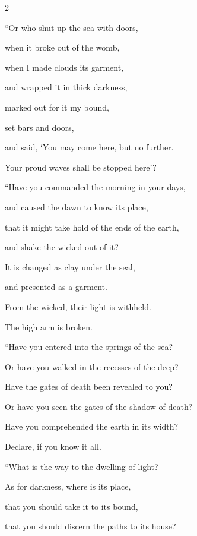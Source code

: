\begin{multicols}{2}
	\vspace{\baselineskip}
	
	\myverse{}“Or who shut up the sea with doors,
	
	when it broke out of the womb,
	
	\myverse{}when I made clouds its garment,
	
	and wrapped it in thick darkness,
	
	\myverse{}marked out for it my bound,
	
	set bars and doors,
	
	\myverse{}and said, ‘You may come here, but no further.
	
	Your proud waves shall be stopped here’?
	
	\vspace{\baselineskip}
	
	
	\myverse{}“Have you commanded the morning in your days,
	
	and caused the dawn to know its place,
	
	\myverse{}that it might take hold of the ends of the earth,
	
	and shake the wicked out of it?
	
	\myverse{}It is changed as clay under the seal,
	
	and presented as a garment.
	
	\myverse{}From the wicked, their light is withheld.
	
	The high arm is broken.
	
	\vspace{\baselineskip}
	
	\myverse{}“Have you entered into the springs of the sea?
	
	Or have you walked in the recesses of the deep?
	
	\myverse{}Have the gates of death been revealed to you?
	
	Or have you seen the gates of the shadow of death?
	
	\myverse{}Have you comprehended the earth in its width?
	
	Declare, if you know it all.
	
	\vspace{\baselineskip}
	
	\myverse{}“What is the way to the dwelling of light?
	
	As for darkness, where is its place,
	
	\myverse{}that you should take it to its bound,
	
	that you should discern the paths to its house?
	

\end{multicols}
